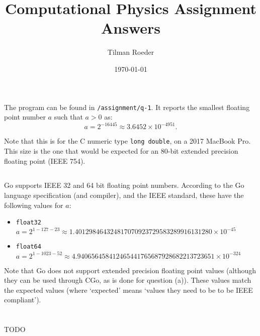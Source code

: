 \documentclass[12pt, a4paper]{article}
\title{Computational Physics Assignment Answers}
\author{Tilman Roeder}
\date{\today}
\begin{document}
\maketitle

\section{}
  \subsection{}
  The program can be found in \texttt{/assignment/q-1}. It reports the smallest floating point number
  $a$ such that $a > 0$ as:
  \begin{equation}
    a = 2^{-16445} \approx 3.6452 \times 10^{-4951}.
  \end{equation}

  Note that this is for the C numeric type \texttt{long double}, on a 2017 MacBook Pro. This size
  is the one that would be expected for an 80-bit extended precision floating point (IEEE 754).

  \subsection{}
  Go supports IEEE 32 and 64 bit floating point numbers. According to the Go language specification
  (and compiler), and the IEEE standard, these have the following values for $a$:
  \begin{itemize}
    \item \texttt{float32} $a = 2^{1-127-23} \approx 1.401298464324817070923729583289916131280 \times 10^{-45}$
    \item \texttt{float64} $a = 2^{1-1023-52} \approx 4.940656458412465441765687928682213723651 \times 10^{-324}$
  \end{itemize}

  Note that Go does not support extended precision floating point values (although they can be used through
  CGo, as is done for question (a)). These values match the expected values (where `expected' means `values
  they need to be to be IEEE compliant').

\section{}
  TODO
\end{document}
